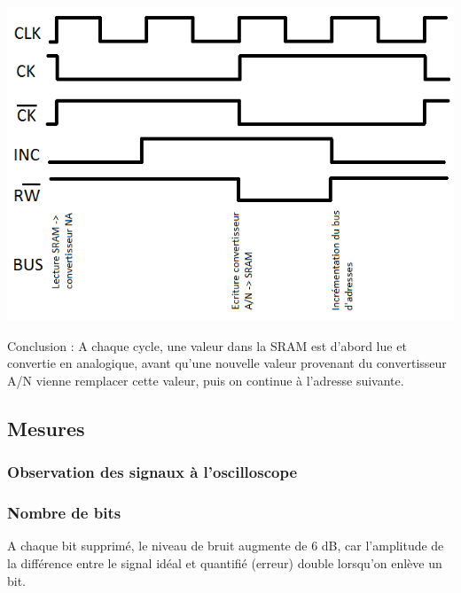\documentclass{article}
\begin{document}
\begin{minipage}{0.67\linewidth}
\includegraphics[width = 1\linewidth]{chronogramme_sequenceur.png}
\end{minipage}\hfill
\begin{minipage}{0.31\linewidth}
Conclusion : A chaque cycle, une valeur dans la SRAM est d'abord lue et convertie en analogique, avant qu'une nouvelle valeur provenant du convertisseur A/N vienne remplacer cette valeur, puis on continue à l'adresse suivante.
\end{minipage}

\subsection{Mesures}

\subsubsection{Observation des signaux à l'oscilloscope}


\subsubsection{Nombre de bits}
A chaque bit supprimé, le niveau de bruit augmente de 6 dB, car l'amplitude de la différence entre le signal idéal et quantifié (erreur) double lorsqu'on enlève un bit.\\
\end{document}
